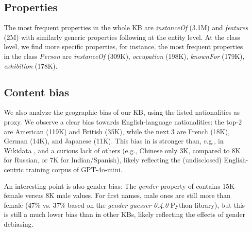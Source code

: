 \subsection{Properties} The most frequent properties in the whole KB are \textit{instanceOf} (3.1M) and \textit{features} (2M) with similarly generic properties following at the entity level. At the class level, we find more specific properties, for instance, the most frequent properties in the class \textit{Person} are \textit{instanceOf} (309K), \textit{occupation} (198K), \textit{knownFor} (179K), \textit{exhibition} (178K).





\subsection{Content bias} 
We also analyze the geographic bias of our KB, using the listed nationalities as proxy. 
We 
observe a clear bias towards English-language nationalities: 
the top-2 are
American (119K) and
British (35K),
while the next 3 are French (18K), German (14K), and Japanese (11K).
This bias in \ourkb{} 
is stronger than, e.g., in Wikidata \cite{shaik2021analyzing}, and a curious lack of others (e.g., Chinese only 3K, compared to 8K for Russian, or 7K for Indian/Spanish), likely reflecting the (undisclosed) English-centric training corpus of GPT-4o-mini. 

An interesting point is also gender bias: The \textit{gender} property of \ourkb{} contains 15K female versus 8K male values. For first names, male ones are still more than female (47\% vs. 37\% based on the \textit{gender-guesser 0.4.0} Python library), but this is still a much lower bias than in other KBs, likely reflecting the effects of gender debiasing. 




